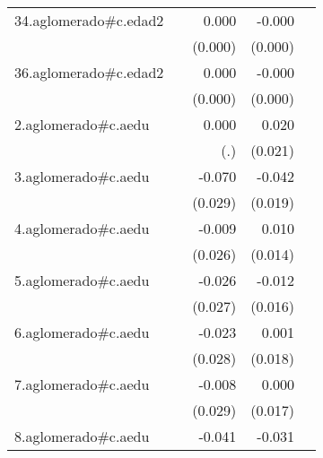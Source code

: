 {\begin{longtable}{l*{4}{D{.}{.}{-1}}}
\addlinespace
34.aglomerado#c.edad2&                     &       0.000         &      -0.000\sym{***}&                     \\
            &                     &     (0.000)         &     (0.000)         &                     \\
\addlinespace
36.aglomerado#c.edad2&                     &       0.000         &      -0.000         &                     \\
            &                     &     (0.000)         &     (0.000)         &                     \\
\addlinespace
2.aglomerado#c.aedu&                     &       0.000         &       0.020         &                     \\
            &                     &         (.)         &     (0.021)         &                     \\
\addlinespace
3.aglomerado#c.aedu&                     &      -0.070\sym{*}  &      -0.042\sym{*}  &                     \\
            &                     &     (0.029)         &     (0.019)         &                     \\
\addlinespace
4.aglomerado#c.aedu&                     &      -0.009         &       0.010         &                     \\
            &                     &     (0.026)         &     (0.014)         &                     \\
\addlinespace
5.aglomerado#c.aedu&                     &      -0.026         &      -0.012         &                     \\
            &                     &     (0.027)         &     (0.016)         &                     \\
\addlinespace
6.aglomerado#c.aedu&                     &      -0.023         &       0.001         &                     \\
            &                     &     (0.028)         &     (0.018)         &                     \\
\addlinespace
7.aglomerado#c.aedu&                     &      -0.008         &       0.000         &                     \\
            &                     &     (0.029)         &     (0.017)         &                     \\
\addlinespace
8.aglomerado#c.aedu&                     &      -0.041         &      -0.031\sym{*}  &                     \\

\end{longtable}}

